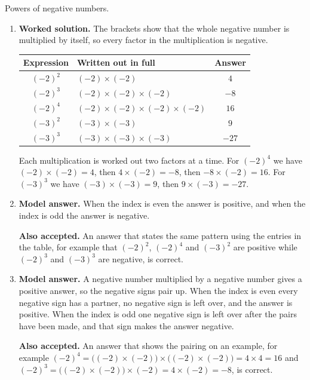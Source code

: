 \documentclass[12pt,a4paper]{article}
\newcommand{\qhead}[2]{\par\addvspace{9pt}%
  \noindent{\bfseries Q#1.}\enspace #2\par\nobreak}
\newcommand{\wsol}{\par\smallskip
  \noindent\textbf{\color{blue!50!black}Worked solution.}\space}
\newcommand{\modelans}{\par\smallskip
  \noindent\textbf{\color{blue!50!black}Model answer.}\space}
\newcommand{\alsoacc}{\par\smallskip
  \noindent\textbf{\color{blue!50!black}Also accepted.}\space}
\begin{document}
\qhead{13}{Powers of negative numbers.}
\begin{enumerate}
\item
\wsol
The brackets show that the whole negative number is multiplied by itself, so
every factor in the multiplication is negative.

\vspace{2pt}
\begin{center}
\renewcommand{\arraystretch}{1.5}
\begin{tabular}{|c|l|c|}
\hline
\textbf{Expression} & \textbf{Written out in full} & \textbf{Answer}\\
\hline
$(-2)^2$ & $(-2)\times(-2)$ & $4$\\ \hline
$(-2)^3$ & $(-2)\times(-2)\times(-2)$ & $-8$\\ \hline
$(-2)^4$ & $(-2)\times(-2)\times(-2)\times(-2)$ & $16$\\ \hline
$(-3)^2$ & $(-3)\times(-3)$ & $9$\\ \hline
$(-3)^3$ & $(-3)\times(-3)\times(-3)$ & $-27$\\ \hline
\end{tabular}
\end{center}

Each multiplication is worked out two factors at a time. For $(-2)^4$ we have
$(-2)\times(-2)=4$, then $4\times(-2)=-8$, then $-8\times(-2)=16$. For $(-3)^3$
we have $(-3)\times(-3)=9$, then $9\times(-3)=-27$.

\item
\modelans
When the index is even the answer is positive, and when the index is odd the
answer is negative.
\alsoacc
An answer that states the same pattern using the entries in the table, for
example that $(-2)^2$, $(-2)^4$ and $(-3)^2$ are positive while $(-2)^3$ and
$(-3)^3$ are negative, is correct.

\item
\modelans
A negative number multiplied by a negative number gives a positive answer, so
the negative signs pair up. When the index is even every negative sign has a
partner, no negative sign is left over, and the answer is positive. When the
index is odd one negative sign is left over after the pairs have been made, and
that sign makes the answer negative.
\alsoacc
An answer that shows the pairing on an example, for example
$(-2)^4=\big((-2)\times(-2)\big)\times\big((-2)\times(-2)\big)=4\times4=16$ and
$(-2)^3=\big((-2)\times(-2)\big)\times(-2)=4\times(-2)=-8$, is correct.
\end{enumerate}
\end{document}
